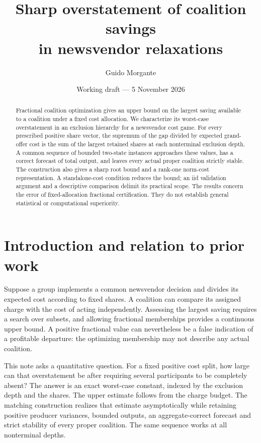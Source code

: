 \documentclass[11pt,a4paper]{article}
\title{Sharp overstatement of coalition savings\\in newsvendor relaxations}
\author{Guido Morgante}
\date{Working draft --- 5 November 2026}
\theoremstyle{remark}
\begin{document}
\maketitle
\begin{abstract}
Fractional coalition optimization gives an upper bound on the largest saving
available to a coalition under a fixed cost allocation. We characterize its
worst-case overstatement in an exclusion hierarchy for a newsvendor cost
game. For every prescribed positive share vector, the supremum of the gap
divided by expected grand-offer cost is the sum of the largest retained
shares at each nonterminal exclusion depth. A common sequence of bounded
two-state instances approaches these values, has a correct forecast of total
output, and leaves every actual proper coalition strictly stable. The
construction also gives a sharp root bound and a rank-one norm-cost
representation. A standalone-cost condition reduces the bound; an iid
validation argument and a descriptive comparison delimit its practical scope.
The results concern the error of fixed-allocation fractional certification.
They do not establish general statistical or computational superiority.
\end{abstract}

\section{Introduction and relation to prior work}

Suppose a group implements a common newsvendor decision and divides its
expected cost according to fixed shares. A coalition can compare its assigned
charge with the cost of acting independently. Assessing the largest saving
requires a search over subsets, and allowing fractional memberships provides
a continuous upper bound. A positive fractional value can nevertheless be a
false indication of a profitable departure: the optimizing membership may
not describe any actual coalition.

This note asks a quantitative question. For a fixed positive cost split,
how large can that overstatement be after requiring several participants to
be completely absent? The answer is an exact worst-case constant, indexed
by the exclusion depth and the shares. The upper estimate follows from the
charge budget. The matching construction realizes that estimate
asymptotically while retaining positive producer variances, bounded outputs,
an aggregate-correct forecast and strict stability of every proper coalition.
The same sequence works at all nonterminal depths.
\end{document}
